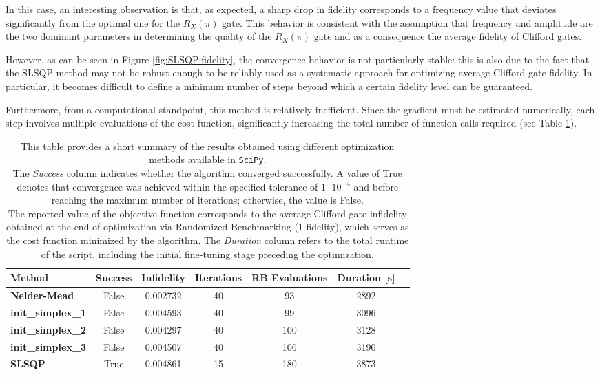 In this case, an interesting observation is that, as expected, a sharp drop in fidelity corresponds to a frequency value that deviates significantly from the optimal one for the $R_X(\pi)$ gate.
This behavior is consistent with the assumption that frequency and amplitude are the two dominant parameters in determining the quality of the $R_X(\pi)$ gate and as a consequence the average fidelity of Clifford gates.

However, as can be seen in Figure \ref{fig:SLSQP:fidelity}, the convergence behavior is not particularly stable: this is also due to the fact that the SLSQP method may not be robust enough to be reliably used as a systematic approach for optimizing average Clifford gate fidelity.
In particular, it becomes difficult to define a minimum number of steps beyond which a certain fidelity level can be guaranteed.

Furthermore, from a computational standpoint, this method is relatively inefficient. 
Since the gradient must be estimated numerically, each step involves multiple evaluations of the cost function, significantly increasing the total number of function calls required (see Table \ref{tab:scipy_opt}).

\begin{table}[h]
    \centering
    \begin{tabular}{lcccccc}
        \toprule
        \textbf{Method} & \textbf{Success} & \textbf{Infidelity} & \textbf{Iterations} & \textbf{RB Evaluations} & \textbf{Duration [s]}\\
        \midrule
        \textbf{Nelder-Mead} & False & 0.002732 & 40 & 93 & 2892 \\
        \textbf{init\_simplex\_1} & False &  0.004593 & 40 & 99 & 3096\\
        \textbf{init\_simplex\_2} & False & 0.004297 & 40 & 100 & 3128\\
        \textbf{init\_simplex\_3} & False & 0.004507 & 40 & 106 & 3190\\
        \textbf{SLSQP} & True & 0.004861 & 15 & 180 & 3873\\
        \bottomrule
    \end{tabular}
    \caption{This table provides a short summary of the results obtained using different optimization methods available in \texttt{SciPy}.\\ 
    The \textit{Success} column indicates whether the algorithm converged successfully. 
    A value of True denotes that convergence was achieved within the specified tolerance of $1\cdot10^{-4}$ and before reaching the maximum number of iterations; otherwise, the value is False.\\
    The reported value of the objective function corresponds to the average Clifford gate infidelity obtained at the end of optimization via Randomized Benchmarking (1-fidelity), which serves as the cost function minimized by the algorithm.
    The \textit{Duration} column refers to the total runtime of the script, including the initial fine-tuning stage preceding the optimization.\\}
    \label{tab:scipy_opt}
\end{table}



